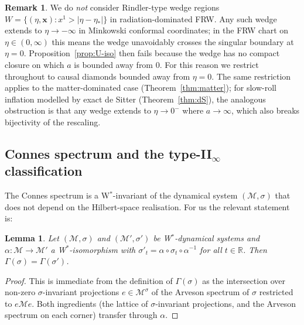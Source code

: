 \documentclass[11pt]{article}
\newtheorem{lemma}[theorem]{Lemma}
\theoremstyle{definition}
\newtheorem{remark}[theorem]{Remark}
\newcommand{\R}{\mathbb{R}}
\newcommand{\MM}{\mathcal{M}}
\begin{document}
\begin{remark}\label{rem:no-wedge}
We do \emph{not} consider Rindler-type wedge regions $W=\{(\eta,\mathbf{x}): x^1>|\eta-\eta_*|\}$ in radiation-dominated FRW. Any such wedge extends to $\eta\to-\infty$ in Minkowski conformal coordinates; in the FRW chart on $\eta\in(0,\infty)$ this means the wedge unavoidably crosses the singular boundary at $\eta=0$. Proposition~\ref{prop:U-iso} then fails because the wedge has no compact closure on which $a$ is bounded away from $0$. For this reason we restrict throughout to causal diamonds bounded away from $\eta=0$. The same restriction applies to the matter-dominated case (Theorem~\ref{thm:matter}); for slow-roll inflation modelled by exact de Sitter (Theorem~\ref{thm:dS}), the analogous obstruction is that any wedge extends to $\eta\to 0^-$ where $a\to\infty$, which also breaks bijectivity of the rescaling.
\end{remark}

\subsection{Connes spectrum and the type-II$_\infty$ classification}

The Connes spectrum is a W$^*$-invariant of the dynamical system $(\MM,\sigma)$ that does not depend on the Hilbert-space realisation. For us the relevant statement is:

\begin{lemma}\label{lem:connes-iso}
Let $(\MM,\sigma)$ and $(\MM',\sigma')$ be W$^*$-dynamical systems and $\alpha:\MM\to\MM'$ a W$^*$-isomorphism with $\sigma'_t = \alpha\circ\sigma_t\circ\alpha^{-1}$ for all $t\in\R$. Then $\Gamma(\sigma)=\Gamma(\sigma')$.
\end{lemma}

\begin{proof}
This is immediate from the definition of $\Gamma(\sigma)$ as the intersection over non-zero $\sigma$-invariant projections $e\in \MM^\sigma$ of the Arveson spectrum of $\sigma$ restricted to $e\MM e$. Both ingredients (the lattice of $\sigma$-invariant projections, and the Arveson spectrum on each corner) transfer through $\alpha$.
\end{proof}
\end{document}
